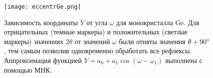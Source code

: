 \begin{figure}[ht!]
    \centering
    \texttt{[image: eccentrGe.png]}
    \caption{Зависимость координаты $Y$ от угла $\omega$ для монокристалла Ge. Для отрицательных (темные маркеры) и положительных (светлые маркеры) значениях $2\theta$ от значений $\omega$ были отняты значения $\theta + 90^\circ$, тем самым позволив одновременно обработать все рефлексы. Аппроксимация функцией $Y = a_0 + a_1 \cos(\omega - \omega_1)$ выполнена с помощью МНК.}
    \label{fig:eccentrGe}
\end{figure}